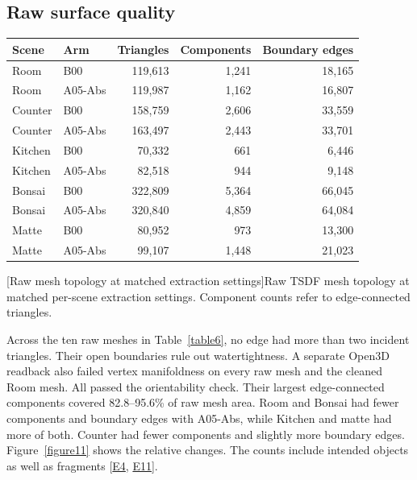 \documentclass[11pt,a4paper]{article}
\begin{document}
\subsection{Raw surface quality}
\begin{center}\begin{minipage}{\linewidth}
\centering\small\setlength{\tabcolsep}{4pt}
\begin{tabular*}{\linewidth}{@{\extracolsep{\fill}}llrrr@{}}
\toprule
\textbf{Scene} & \textbf{Arm} & \textbf{Triangles} & \textbf{Components} & \textbf{Boundary edges} \\
\midrule
Room & B00 & 119,613 & 1,241 & 18,165 \\
Room & A05-Abs & 119,987 & 1,162 & 16,807 \\
\addlinespace[2pt]
Counter & B00 & 158,759 & 2,606 & 33,559 \\
Counter & A05-Abs & 163,497 & 2,443 & 33,701 \\
\addlinespace[2pt]
Kitchen & B00 & 70,332 & 661 & 6,446 \\
Kitchen & A05-Abs & 82,518 & 944 & 9,148 \\
\addlinespace[2pt]
Bonsai & B00 & 322,809 & 5,364 & 66,045 \\
Bonsai & A05-Abs & 320,840 & 4,859 & 64,084 \\
\addlinespace[2pt]
Matte & B00 & 80,952 & 973 & 13,300 \\
Matte & A05-Abs & 99,107 & 1,448 & 21,023 \\
\bottomrule
\end{tabular*}\par
{}[Raw mesh topology at matched extraction settings]{Raw TSDF mesh topology at matched per-scene extraction settings. Component counts refer to edge-connected triangles.}\label{table6}
\end{minipage}\end{center}
Across the ten raw meshes in Table~\ref{table6}, no edge had more than two incident triangles. Their open boundaries rule out watertightness. A separate Open3D readback also failed vertex manifoldness on every raw mesh and the cleaned Room mesh. All passed the orientability check. Their largest edge-connected components covered 82.8--95.6\% of raw mesh area. Room and Bonsai had fewer components and boundary edges with A05-Abs, while Kitchen and matte had more of both. Counter had fewer components and slightly more boundary edges. Figure~\ref{figure11} shows the relative changes. The counts include intended objects as well as fragments [\hyperlink{evE4}{E4}, \hyperlink{evE11}{E11}].\par
\end{document}
